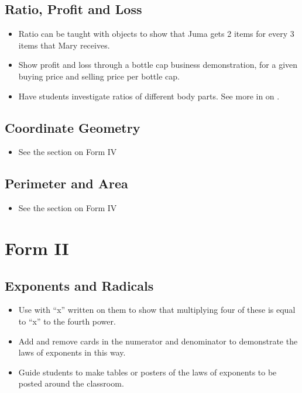 	\subsection{Ratio, Profit and Loss}
	\begin{itemize}
	\item Ratio can be taught with objects to show that Juma gets 2 items for every 3 items that Mary receives.
	\item Show profit and loss through a bottle cap business demonstration, for a given buying price and selling price per bottle cap.
	\item Have students investigate ratios of different body parts. See more in  on .
	\end{itemize}
	
	\subsection{Coordinate Geometry}
	\begin{itemize}
	\item See the section on Form IV 
	\end{itemize}
	
	\subsection{Perimeter and Area}
	\begin{itemize}
	\item See the section on Form IV 
	\end{itemize}

\section{Form II}

	\subsection{Exponents and Radicals}
	\begin{itemize}
	\item Use  with ``x'' written on them to show that multiplying four of these is equal to ``x'' to the fourth power. 
	\item Add and remove cards in the numerator and denominator to demonstrate the laws of exponents in this way.
	\item Guide students to make tables or posters of the laws of exponents to be posted around the classroom.
	\end{itemize}
	
